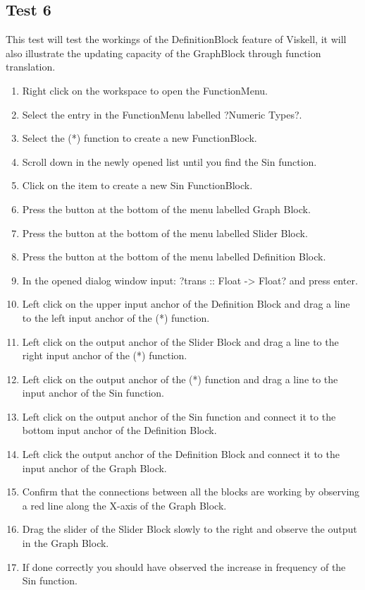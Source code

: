 	\subsection{Test 6}
		This test will test the workings of the DefinitionBlock feature of Viskell, it will also illustrate the updating capacity of the GraphBlock through function translation.

		\begin{enumerate}
			\item Right click on the workspace to open the FunctionMenu.
			\item Select the entry in the FunctionMenu labelled ?Numeric Types?.
			\item Select the (*) function to create a new FunctionBlock.
			\item	Scroll down in the newly opened list until you find the Sin function.
			\item Click on the item to create a new Sin FunctionBlock.
			\item Press the button at the bottom of the menu labelled Graph Block.
			\item Press the button at the bottom of the menu labelled Slider Block.
			\item Press the button at the bottom of the menu labelled Definition Block.
			\item In the opened dialog window input: ?trans :: Float -> Float? and press enter.
			\item Left click on the upper input anchor of the Definition Block and drag a line to the left input anchor of the (*) function.
			\item Left click on the output anchor of the Slider Block and drag a line to the right input anchor of the (*) function.
			\item Left click on the output anchor of the (*) function and drag a line to the input anchor of the Sin function.
			\item Left click on the output anchor of the Sin function and connect it to the bottom input anchor of the Definition Block.
			\item Left click the output anchor of the Definition Block and connect it to the input anchor of the Graph Block.
			\item Confirm that the connections between all the blocks are working by observing a red line along the X-axis of the Graph Block.
			\item Drag the slider of the Slider Block slowly to the right and observe the output in the Graph Block.
			\item If done correctly you should have observed the increase in frequency of the Sin function.
		\end{enumerate}

